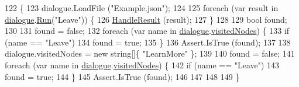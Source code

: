 \begin{DoxyCode}
122                                         \{
123             dialogue.LoadFile (\textcolor{stringliteral}{"Example.json"});
124 
125             \textcolor{keywordflow}{foreach} (var result \textcolor{keywordflow}{in} \hyperlink{a00146_a4cff5de56c4b8a91c76b6eb2d622a795}{dialogue}.\hyperlink{a00072_aead84ee50cb113ca45724894290ce9c2}{Run}(\textcolor{stringliteral}{"Leave"})) \{
126                 \hyperlink{a00146_a7b525f85a26d7c942e1cbfa5d6453893}{HandleResult} (result);
127             \}
128 
129             \textcolor{keywordtype}{bool} found;
130 
131             found = \textcolor{keyword}{false};
132             \textcolor{keywordflow}{foreach} (var name \textcolor{keywordflow}{in} \hyperlink{a00146_a4cff5de56c4b8a91c76b6eb2d622a795}{dialogue}.\hyperlink{a00072_ac5661051e0b7f44527fe526c7766dbbf}{visitedNodes}) \{
133                 \textcolor{keywordflow}{if} (name == \textcolor{stringliteral}{"Leave"})
134                     found = \textcolor{keyword}{true};
135             \}
136             Assert.IsTrue (found);
137 
138             dialogue.visitedNodes = \textcolor{keyword}{new} \textcolor{keywordtype}{string}[]\{ \textcolor{stringliteral}{"LearnMore"} \};
139 
140             found = \textcolor{keyword}{false};
141             \textcolor{keywordflow}{foreach} (var name \textcolor{keywordflow}{in} \hyperlink{a00146_a4cff5de56c4b8a91c76b6eb2d622a795}{dialogue}.\hyperlink{a00072_ac5661051e0b7f44527fe526c7766dbbf}{visitedNodes}) \{
142                 \textcolor{keywordflow}{if} (name == \textcolor{stringliteral}{"Leave"})
143                     found = \textcolor{keyword}{true};
144             \}
145             Assert.IsTrue (found);
146 
147                 
148 
149         \}
\end{DoxyCode}


